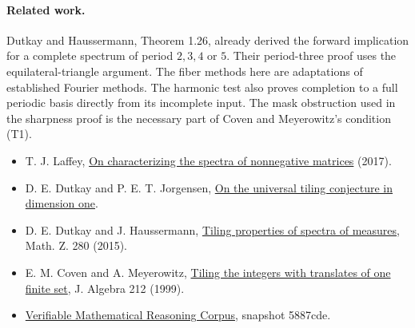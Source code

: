 \documentclass[11pt,a4paper]{article}
\begin{document}
\paragraph{Related work.} Dutkay and Haussermann, Theorem 1.26, already derived the forward implication for a complete spectrum of period $2,3,4$ or $5$. Their period-three proof uses the equilateral-triangle argument. The fiber methods here are adaptations of established Fourier methods. The harmonic test also proves completion to a full periodic basis directly from its incomplete input. The mask obstruction used in the sharpness proof is the necessary part of Coven and Meyerowitz's condition (T1).
\begin{itemize}\setlength\itemsep{2pt}
\item T. J. Laffey, \href{https://www.math.ualberta.ca/~vtroitsky/positivity2017/talks/Laffey.pdf}{On characterizing the spectra of nonnegative matrices} (2017).
\item D. E. Dutkay and P. E. T. Jorgensen, \href{https://arxiv.org/abs/1209.0666}{On the universal tiling conjecture in dimension one}.
\item D. E. Dutkay and J. Haussermann, \href{https://arxiv.org/abs/1210.8340}{Tiling properties of spectra of measures}, Math. Z. 280 (2015).
\item E. M. Coven and A. Meyerowitz, \href{https://arxiv.org/abs/math/9802122}{Tiling the integers with translates of one finite set}, J. Algebra 212 (1999).
\item \href{https://github.com/QEEDDD/Verifiable-Mathematical-Reasoning-Corpus/tree/5887cdea4898f0a3aa5bf7a8e0829697bd2b0f4b}{Verifiable Mathematical Reasoning Corpus}, snapshot 5887cde.
\end{itemize}
\end{document}
